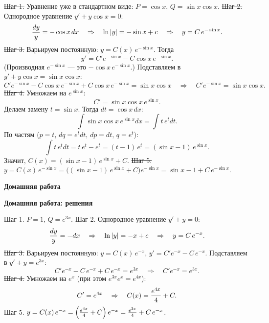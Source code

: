 \st{Шаг 1.} Уравнение уже в стандартном виде:
$P=\cos x$, $Q=\sin x\cos x$.
\st{Шаг 2.} Однородное уравнение $y'+y\cos x=0$:
$${dy\over y}=-\cos x\,dx\quad\Rightarrow\quad\ln|y|=-\sin x+c
\quad\Rightarrow\quad y=C\,e^{-\sin x}.$$
\st{Шаг 3.} Варьируем постоянную: $y=C(x)\,e^{-\sin x}$. Тогда
$$y'=C'e^{-\sin x}-C\cos x\,e^{-\sin x}.$$
(Производная $e^{-\sin x}$ --- это $-\cos x\,e^{-\sin x}$.) Подставляем в
$y'+y\cos x=\sin x\cos x$:
$$C'e^{-\sin x}-C\cos x\,e^{-\sin x}+C\cos x\,e^{-\sin x}=\sin x\cos x
\quad\Rightarrow\quad C'e^{-\sin x}=\sin x\cos x.$$
\st{Шаг 4.} Умножаем на $e^{\sin x}$:
$$C'=\sin x\cos x\,e^{\sin x}.$$
Делаем замену $t=\sin x$. Тогда $dt=\cos x\,dx$:
$$\int\sin x\cos x\,e^{\sin x}dx=\int t\,e^{t}dt.$$
По частям ($p=t$, $dq=e^tdt$, $dp=dt$, $q=e^t$):
$$\int t\,e^tdt=t\,e^t-e^t=(t-1)\,e^t=(\sin x-1)\,e^{\sin x}.$$
Значит, $C(x)=(\sin x-1)\,e^{\sin x}+C$.
\st{Шаг 5.} $y=C(x)\,e^{-\sin x}=\bigl((\sin x-1)\,e^{\sin x}+C\bigr)e^{-\sin x}
=\sin x-1+C\,e^{-\sin x}$.

\vfil\eject

\centerline{\bf Домашняя работа}
\bigskip

\bigskip

\bigskip

\bigskip

\bigskip

\bigskip

\bigskip

\bigskip

\bigskip

\bigskip


\vfil\eject

\centerline{\bf Домашняя работа: решения}
\bigskip

\st{Шаг 1.} $P=1$, $Q=e^{3x}$.
\st{Шаг 2.} Однородное уравнение $y'+y=0$:
$${dy\over y}=-dx\quad\Rightarrow\quad\ln|y|=-x+c
\quad\Rightarrow\quad y=C\,e^{-x}.$$
\st{Шаг 3.} Варьируем постоянную: $y=C(x)\,e^{-x}$, $y'=C'e^{-x}-C\,e^{-x}$.
Подставляем в $y'+y=e^{3x}$:
$$C'e^{-x}-C\,e^{-x}+C\,e^{-x}=e^{3x}\quad\Rightarrow\quad C'e^{-x}=e^{3x}.$$
\st{Шаг 4.} Умножаем на $e^{x}$ (при этом $e^{3x}e^{x}=e^{4x}$):
$$C'=e^{4x}\quad\Rightarrow\quad C(x)={e^{4x}\over4}+C.$$
\st{Шаг 5.} $y=C(x)\,e^{-x}=\left({e^{4x}\over4}+C\right)e^{-x}
={e^{3x}\over4}+C\,e^{-x}$.

